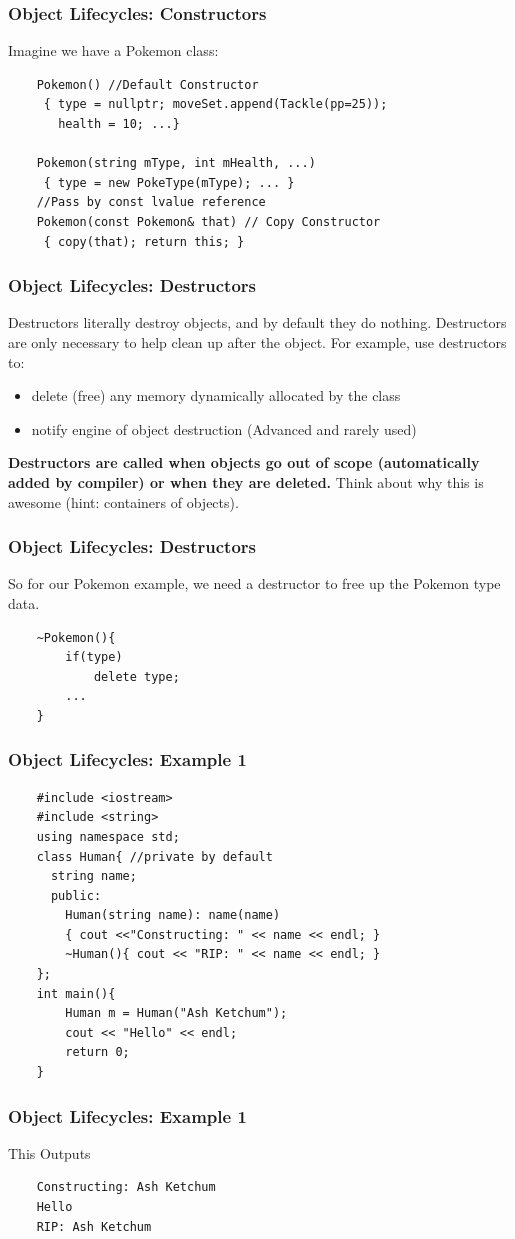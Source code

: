 \documentclass{beamer}
\begin{document}
\begin{frame}[fragile]
    \frametitle{Object Lifecycles: Constructors}
    Imagine we have a Pokemon class:
    \begin{verbatim}
    Pokemon() //Default Constructor
     { type = nullptr; moveSet.append(Tackle(pp=25)); 
       health = 10; ...}
    
    Pokemon(string mType, int mHealth, ...)
     { type = new PokeType(mType); ... }
    //Pass by const lvalue reference 
    Pokemon(const Pokemon& that) // Copy Constructor
     { copy(that); return this; }
    \end{verbatim}
\end{frame}

\begin{frame}
\frametitle{Object Lifecycles: Destructors}
    Destructors literally destroy objects, and by default they do nothing.
    Destructors are only necessary to help clean up after the object. 
    For example, use destructors to:
    \begin{itemize}
    \item delete (free) any memory dynamically allocated by the class
    \item notify engine of object destruction (Advanced and rarely used)
    \end{itemize}

    \textbf{Destructors are called when objects go out of scope (automatically added by compiler) or when they are deleted.}
    Think about why this is awesome (hint: containers of objects).
\end{frame}

\begin{frame}[fragile]
    \frametitle{Object Lifecycles: Destructors}
    So for our Pokemon example, we need a destructor to free up the Pokemon type data.

    \begin{verbatim}
    ~Pokemon(){ 
        if(type) 
            delete type;
        ...
    }
    \end{verbatim}
\end{frame}

\begin{frame}[fragile]
    \frametitle{Object Lifecycles: Example 1}
    \begin{verbatim}
    #include <iostream>
    #include <string>
    using namespace std;
    class Human{ //private by default
      string name;
      public:
        Human(string name): name(name) 
        { cout <<"Constructing: " << name << endl; }
        ~Human(){ cout << "RIP: " << name << endl; }
    };
    int main(){
        Human m = Human("Ash Ketchum");
        cout << "Hello" << endl;
        return 0;
    }
    \end{verbatim}
\end{frame}
\begin{frame}[fragile]
    \frametitle{Object Lifecycles: Example 1}
    This Outputs
    \begin{verbatim}
    Constructing: Ash Ketchum
    Hello
    RIP: Ash Ketchum
    \end{verbatim}

\end{frame}
\end{document}
